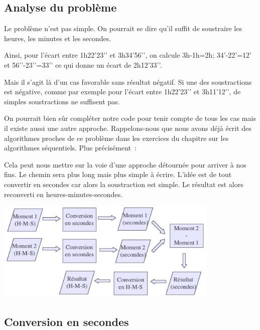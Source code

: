 	\subsection*{Analyse du problème}
	
		Le problème n’est pas simple. 
		On pourrait se dire qu’il suffit de soustraire les heures, 
		les minutes et les secondes.
	
		Ainsi, pour l’écart entre
		1h22’23’’ et 3h34’56’’, 
		on calcule 3h-1h=2h; 34’-22’=12’ et 56’’-23’’=33’’
		ce qui donne un écart de 2h12’33’’.
	
		Mais il s’agit là d’un cas favorable sans résultat négatif. 
		Si une des soustractions est négative, 
		comme par exemple pour l’écart entre
		1h22’23’’ et 3h11’12’’, 
		de simples soustractions ne suffisent pas.
	
		On pourrait bien sûr compléter notre code 
		pour tenir compte de tous les cas 
		mais il existe aussi une autre approche. 
		Rappelons-nous que nous avons déjà écrit des algorithmes 
		proches de ce problème dans les exercices du chapitre 
		sur les algorithmes séquentiels. 
		Plus précisément~:
	
		\begin{Pseudocode}
		\end{Pseudocode}
	
		Cela peut nous mettre sur la voie d’une approche
		détournée pour arriver à nos fins.
		Le chemin sera plus long mais plus simple à écrire. 
		L’idée est de tout convertir en secondes 
		car alors la soustraction est simple.
		Le résultat est alors reconverti en heures-minutes-secondes.
	
		\begin{center}
		\includegraphics[width=0.8\textwidth]{image/module-conversion}
		\end{center}
	
	\subsection*{Conversion en secondes}
	
